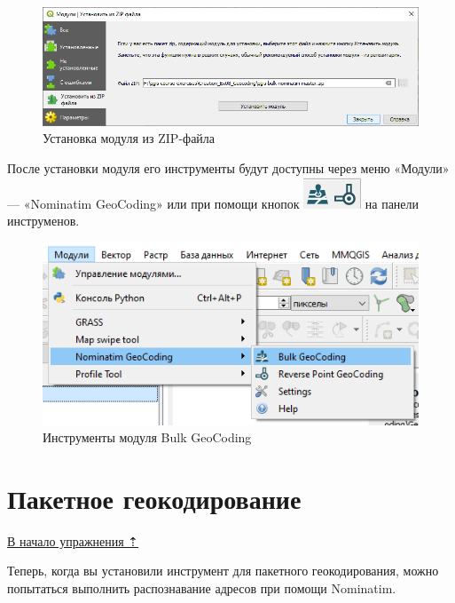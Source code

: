 \documentclass[
  12pt,
]{book}
\begin{document}
\begin{enumerate}
  \begin{figure}
  \centering
  \includegraphics{images/Ex08_Geocoding/bulk-nominatim03.png}
  \caption{Установка модуля из ZIP-файла}
  \end{figure}
\end{enumerate}

После установки модуля его инструменты будут доступны через меню «Модули» --- «Nominatim GeoCoding» или при помощи кнопок \includegraphics{images/Ex08_Geocoding/bulk-nominatim04.png} на панели инструменов.

\begin{figure}
\centering
\includegraphics{images/Ex08_Geocoding/bulk-nominatim05.png}
\caption{Инструменты модуля Bulk GeoCoding}
\end{figure}

\hypertarget{geocoding-batch}{%
\section{Пакетное геокодирование}\label{geocoding-batch}}

\protect\hyperlink{geocoding}{В начало упражнения ⇡}

Теперь, когда вы установили инструмент для пакетного геокодирования, можно попытаться выполнить распознавание адресов при помощи Nominatim.
\end{document}
